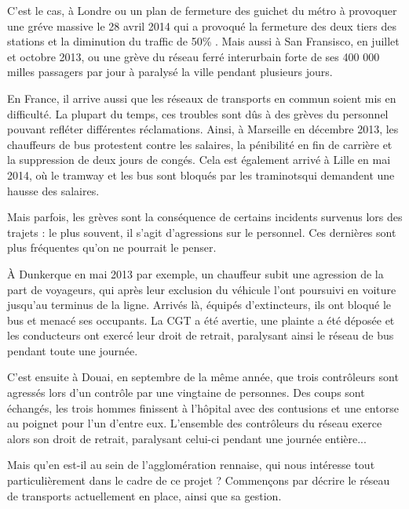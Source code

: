 	C'est le cas, à Londre ou un plan de fermeture des guichet du métro à provoquer une gréve massive le 28 avril 2014 qui a provoqué la fermeture des deux tiers des stations et la diminution du traffic de 50\% \cite{tubeApril}. Mais aussi à San Fransisco, en juillet et octobre 2013, ou une grève du réseau ferré interurbain forte de ses 400 000 milles passagers par jour à paralysé la ville pendant plusieurs jours. \cite{SFbart}
 

	En France, il arrive aussi que les réseaux de transports en commun soient mis en difficulté. La plupart du temps, ces troubles sont dûs à des grèves du personnel pouvant refléter différentes réclamations. Ainsi, à Marseille en décembre 2013, les chauffeurs de bus protestent contre les salaires, la pénibilité en fin de carrière et la suppression de deux jours de congés. Cela est également arrivé à Lille en mai 2014, où le tramway et les bus sont bloqués par les traminotsqui demandent une hausse des salaires.

	Mais parfois, les grèves sont la conséquence de certains incidents survenus lors des trajets : le plus souvent, il s'agit d'agressions sur le personnel. Ces dernières sont plus fréquentes qu'on ne pourrait le penser.

	À Dunkerque en mai 2013 par exemple, un chauffeur subit une agression de la part de voyageurs, qui après leur exclusion du véhicule l'ont poursuivi en voiture jusqu'au terminus de la ligne. Arrivés là, équipés d'extincteurs, ils ont bloqué le bus et menacé ses occupants. La CGT a été avertie, une plainte a été déposée et les conducteurs ont exercé leur droit de retrait, paralysant ainsi le réseau de bus pendant toute une journée.

	C'est ensuite à Douai, en septembre de la même année, que trois contrôleurs sont agressés lors d'un contrôle par une vingtaine de personnes. Des coups sont échangés, les trois hommes finissent à l'hôpital avec des contusions et une entorse au poignet pour l'un d'entre eux. L'ensemble des contrôleurs du réseau exerce alors son droit de retrait, paralysant celui-ci pendant une journée entière...

	Mais qu'en est-il au sein de l'agglomération rennaise, qui nous intéresse tout particulièrement dans le cadre de ce projet ? Commençons par décrire le réseau de transports actuellement en place, ainsi que sa gestion.


